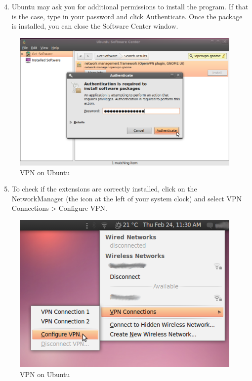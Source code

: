 \begin{enumerate}[1.]
\setcounter{enumi}{3}
\item
  Ubuntu may ask you for additional permissions to install the program.
  If that is the case, type in your password and click Authenticate.
  Once the package is installed, you can close the Software Center
  window.
\end{enumerate}
\begin{figure}[htbp]
\centering
\includegraphics{vpn_ubuntu_004.png}
\caption{VPN on Ubuntu}
\end{figure}

\begin{enumerate}[1.]
\setcounter{enumi}{4}
\item
  To check if the extensions are correctly installed, click on the
  NetworkManager (the icon at the left of your system clock) and select
  VPN Connections \textgreater{} Configure VPN.
\end{enumerate}
\begin{figure}[htbp]
\centering
\includegraphics{vpn_ubuntu_005.png}
\caption{VPN on Ubuntu}
\end{figure}


